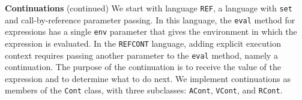 \begin{minipage}[t]{\sw}
\slidenumber
\LARGE
{\bf Continuations} (continued)\exx
We start with language \verb'REF',
a language with \verb'set'
and call-by-reference parameter passing.
In this language,
the \verb'eval' method for expressions has a single \verb'env' parameter
that gives the environment in which the expression is evaluated.
In the \verb'REFCONT' language,
adding explicit execution context requires passing another parameter
to the \verb'eval' method,
namely a continuation.
The purpose of the continuation is to receive
the value of the expression and to determine what to do next.\exx
We implement continuations as members
of the \verb'Cont' class, with three subclasses:
\verb'ACont', \verb'VCont', and \verb'RCont'.
\end{minipage}
